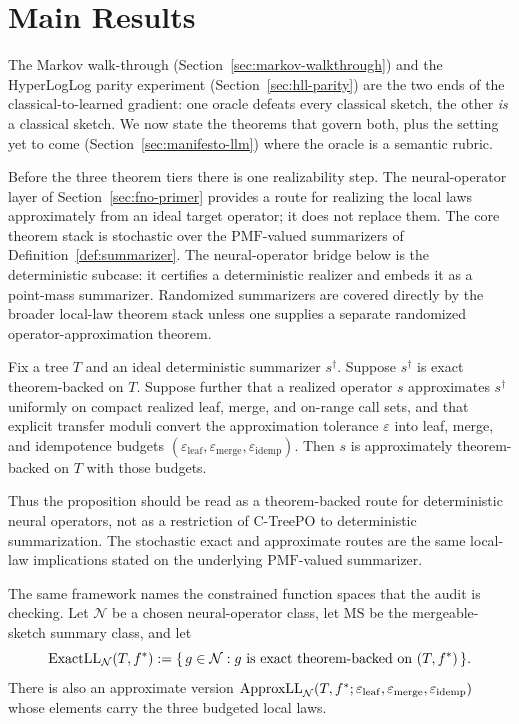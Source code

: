 \section{Main Results}\label{sec:theorems}

The Markov walk-through (Section~\ref{sec:markov-walkthrough}) and the
HyperLogLog parity experiment (Section~\ref{sec:hll-parity}) are the two
ends of the classical-to-learned gradient: one oracle defeats every
classical sketch, the other \emph{is} a classical sketch. We now state
the theorems that govern both, plus the setting yet to come
(Section~\ref{sec:manifesto-llm}) where the oracle is a semantic rubric.

Before the three theorem tiers there is one realizability step. The
neural-operator layer of Section~\ref{sec:fno-primer} provides a route
for realizing the local laws approximately from an ideal target
operator; it does not replace them. The core theorem stack is stochastic
over the $\mathrm{PMF}$-valued summarizers of Definition~\ref{def:summarizer}.
The neural-operator bridge below is the deterministic subcase: it
certifies a deterministic realizer and embeds it as a point-mass
summarizer. Randomized summarizers are covered directly by the broader
local-law theorem stack unless one supplies a separate randomized
operator-approximation theorem.

\begin{proposition}\label{prop:neural-operator-bridge}
Fix a tree $T$ and an ideal deterministic summarizer $s^\dagger$.
Suppose $s^\dagger$ is exact theorem-backed on $T$. Suppose further that
a realized operator $s$ approximates $s^\dagger$ uniformly on compact
realized leaf, merge, and on-range call sets, and that explicit
transfer moduli convert the approximation tolerance $\varepsilon$ into
leaf, merge, and idempotence budgets
$(\varepsilon_{\mathrm{leaf}}, \varepsilon_{\mathrm{merge}},
\varepsilon_{\mathrm{idemp}})$. Then $s$ is approximately
theorem-backed on $T$ with those budgets.
\end{proposition}

Thus the proposition should be read as a theorem-backed route for
deterministic neural operators, not as a restriction of C-TreePO to
deterministic summarization. The stochastic exact and approximate
routes are the same local-law implications stated on the underlying
$\mathrm{PMF}$-valued summarizer.

The same framework names the constrained function spaces that the
audit is checking. Let $\mathcal{N}$ be a chosen neural-operator class,
let $\mathrm{MS}$ be the mergeable-sketch summary class, and let
\[
\mathrm{ExactLL}_{\mathcal{N}}(T,f^\ast)
  := \{\,g\in\mathcal{N}: g \text{ is exact theorem-backed on }(T,f^\ast)\,\}.
\]
There is also an approximate version
$\mathrm{ApproxLL}_{\mathcal{N}}(T,f^\ast;\varepsilon_{\mathrm{leaf}},
\varepsilon_{\mathrm{merge}},\varepsilon_{\mathrm{idemp}})$ whose elements carry
the three budgeted local laws.

